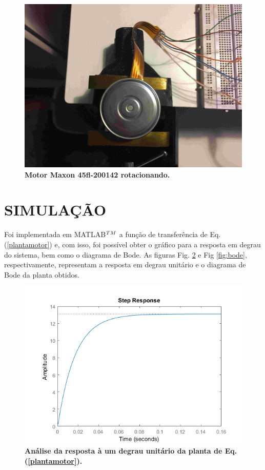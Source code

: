 \documentclass[10pt,fleqn,a4paper]{article}
\begin{document}
	\begin{figure}[ht]
		\begin{center}
			\includegraphics[angle=0, scale=0.06]{images/motornovo}
		\end{center}
		\caption{\textbf{Motor Maxon 45fl-200142 rotacionando.}}
		\label{fig:motornovo}
	\end{figure}
    
    \section{SIMULAÇÃO}
    
    Foi implementada em MATLAB$^{\small{TM}}$ a função de transferência de Eq. (\ref{plantamotor}) e, com isso, foi possível obter o gráfico para a resposta em degrau do sistema, bem como o diagrama de Bode. As figuras Fig. \ref{fig:respostaemdegrau} e Fig \ref{fig:bode}, respectivamente, representam a resposta em degrau unitário e o diagrama de Bode da planta obtidos.

	\begin{figure}[ht]
		\begin{center}
			\includegraphics[angle=0, scale=0.7]{images/stepResponse}
		\end{center}
		\caption{\textbf{Análise da resposta à um degrau unitário da planta de Eq. (\ref{plantamotor}).}}
		\label{fig:respostaemdegrau}
	\end{figure}
\end{document}
